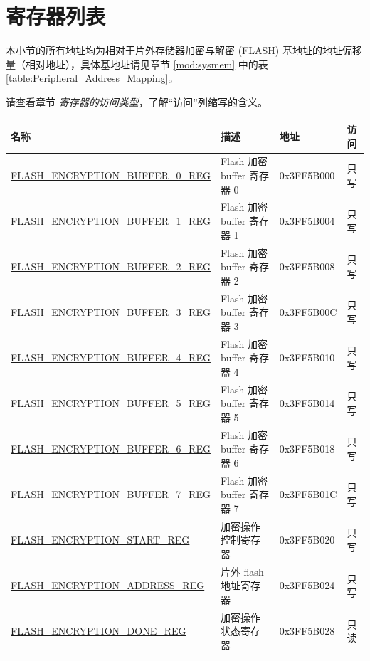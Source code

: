 \documentclass[main\_\_CN.tex]{subfiles}
\begin{document}
\hypertarget{extmemencr-reg-summ}{}
\section{寄存器列表}
\label{sec:flash-reg-sum}

本小节的所有地址均为相对于片外存储器加密与解密 (FLASH) 基地址的地址偏移量（相对地址），具体基地址请见章节 \ref{mod:sysmem} \textit{} 中的表 \ref{table:Peripheral_Address_Mapping}。

请查看章节 \hyperref[glossary-access-types]{\textit{寄存器的访问类型}}，了解“访问”列缩写的含义。

\begin{longtable}{ | p{6.5cm} | p{5cm} | p{2cm} | p{1cm} | }
\hline\rowcolor{lightgray}
名称 & 描述 &  地址 & 访问 \\ \hline
\hyperref[regdesc:FLASHENCRYPTIONBUFFERnREG]{FLASH\_ENCRYPTION\_BUFFER\_0\_REG} & Flash 加密 buffer 寄存器 0 & 0x3FF5B000 &只写 \\ \hline
\hyperref[regdesc:FLASHENCRYPTIONBUFFERnREG]{FLASH\_ENCRYPTION\_BUFFER\_1\_REG} & Flash 加密 buffer 寄存器 1 & 0x3FF5B004 & 只写 \\ \hline
\hyperref[regdesc:FLASHENCRYPTIONBUFFERnREG]{FLASH\_ENCRYPTION\_BUFFER\_2\_REG} & Flash 加密 buffer 寄存器 2 & 0x3FF5B008 &只写 \\ \hline
\hyperref[regdesc:FLASHENCRYPTIONBUFFERnREG]{FLASH\_ENCRYPTION\_BUFFER\_3\_REG} & Flash 加密 buffer 寄存器 3 & 0x3FF5B00C & 只写 \\ \hline
\hyperref[regdesc:FLASHENCRYPTIONBUFFERnREG]{FLASH\_ENCRYPTION\_BUFFER\_4\_REG} & Flash 加密 buffer 寄存器 4 & 0x3FF5B010 &只写 \\ \hline
\hyperref[regdesc:FLASHENCRYPTIONBUFFERnREG]{FLASH\_ENCRYPTION\_BUFFER\_5\_REG} & Flash 加密 buffer 寄存器 5 & 0x3FF5B014 & 只写 \\ \hline
\hyperref[regdesc:FLASHENCRYPTIONBUFFERnREG]{FLASH\_ENCRYPTION\_BUFFER\_6\_REG} & Flash 加密 buffer 寄存器 6 & 0x3FF5B018 & 只写 \\ \hline
\hyperref[regdesc:FLASHENCRYPTIONBUFFERnREG]{FLASH\_ENCRYPTION\_BUFFER\_7\_REG} & Flash 加密 buffer 寄存器 7 & 0x3FF5B01C & 只写 \\ \hline
\hyperref[regdesc:FLASHENCRYPTIONSTARTREG]{FLASH\_ENCRYPTION\_START\_REG} & 加密操作控制寄存器 & 0x3FF5B020 & 只写 \\ \hline
\hyperref[regdesc:FLASHENCRYPTIONADDRESSREG]{FLASH\_ENCRYPTION\_ADDRESS\_REG} & 片外 flash 地址寄存器 & 0x3FF5B024 & 只写 \\ \hline
\hyperref[regdesc:FLASHENCRYPTIONDONEREG]{FLASH\_ENCRYPTION\_DONE\_REG} & 加密操作状态寄存器 & 0x3FF5B028 & 只读 \\ \hline

\end{longtable}
\end{document}
